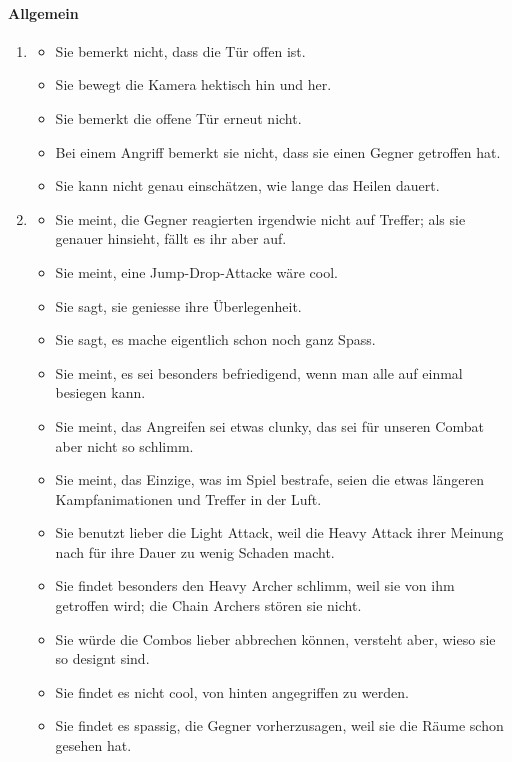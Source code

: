 \documentclass[../Main.tex]{subfiles}
\begin{document}
\paragraph{Allgemein}
\begin{enumerate}[label=\textbf{B\arabic*}, leftmargin=1.5cm, itemsep=0.8em, resume]
\item
\begin{itemize}[nosep]
\item Sie bemerkt nicht, dass die Tür offen ist.
\item Sie bewegt die Kamera hektisch hin und her.
\item Sie bemerkt die offene Tür erneut nicht.
\item Bei einem Angriff bemerkt sie nicht, dass sie einen Gegner getroffen hat.
\item Sie kann nicht genau einschätzen, wie lange das Heilen dauert.
\end{itemize}
\item
\begin{itemize}[nosep]
\item Sie meint, die Gegner reagierten irgendwie nicht auf Treffer; als sie genauer hinsieht, fällt es ihr aber auf.
\item Sie meint, eine Jump-Drop-Attacke wäre cool.
\item Sie sagt, sie geniesse ihre Überlegenheit.
\item Sie sagt, es mache eigentlich schon noch ganz Spass.
\item Sie meint, es sei besonders befriedigend, wenn man alle auf einmal besiegen kann.
\item Sie meint, das Angreifen sei etwas clunky, das sei für unseren Combat aber nicht so schlimm.
\item Sie meint, das Einzige, was im Spiel bestrafe, seien die etwas längeren Kampfanimationen und Treffer in der Luft.
\item Sie benutzt lieber die Light Attack, weil die Heavy Attack ihrer Meinung nach für ihre Dauer zu wenig Schaden macht.
\item Sie findet besonders den Heavy Archer schlimm, weil sie von ihm getroffen wird; die Chain Archers stören sie nicht.
\item Sie würde die Combos lieber abbrechen können, versteht aber, wieso sie so designt sind.
\item Sie findet es nicht cool, von hinten angegriffen zu werden.
\item Sie findet es spassig, die Gegner vorherzusagen, weil sie die Räume schon gesehen hat.

\end{itemize}
\end{enumerate}
\end{document}
